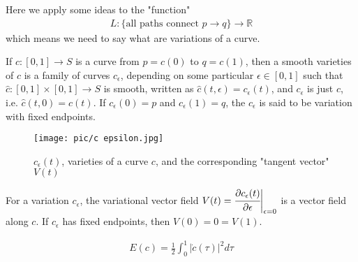 \documentclass[10pt]{article}
\begin{document}
            Here we apply some ideas to the "function"
            \begin{equation*}
                \begin{aligned}
                    L: \{\text{all paths connect } p\rightarrow q\} \rightarrow\mathbb{R}
                \end{aligned}
            \end{equation*}
            which means we need to say what are variations of a curve.
            \begin{definition}
                If $c: [0, 1]\rightarrow S$ is a curve from $p=c(0)$ to $q=c(1)$, then a smooth varieties of $c$ is a family of curves $c_\epsilon$, depending on some particular $\epsilon\in[0,1]$ such that $\hat{c}:[0,1]\times[0,1]\rightarrow S$ is smooth, written as $\hat{c}(t,\epsilon) = c_\epsilon(t)$, and $c_\epsilon$ is just $c$, i.e. $\hat{c}(t, 0) = c(t)$. If $c_\epsilon(0) = p$ and $c_\epsilon(1) = q$, the $c_\epsilon$ is said to be variation with fixed endpoints.
            \end{definition}
            \vspace{-0.35cm}
            \begin{marginfigure}
                \vspace{-2.5cm}
                \begin{figure}[H]
                    \centering
                    \texttt{[image: pic/c epsilon.jpg]}
                    \caption{$c_\epsilon(t)$, varieties of a curve $c$, and the corresponding "tangent vector" $V(t)$}
                \end{figure}
		\end{marginfigure}
            \begin{definition}
                For a variation $c_\epsilon$, the variational vector field $V(t) = \cfrac{\partial c_\epsilon(t)}{\partial\epsilon}\bigg|_{\epsilon=0}$ is a vector field along $c$. If $c_\epsilon$ has fixed endpoints, then $V(0) = 0 = V(1)$.
            \end{definition}

            \begin{definition}
                \begin{equation*}
                    \begin{aligned}
                        E(c) = \frac{1}{2}\int_0^1\big|\dot{c}(\tau)\big|^2d\tau
                    \end{aligned}
                \end{equation*}
            \end{definition}
\end{document}
